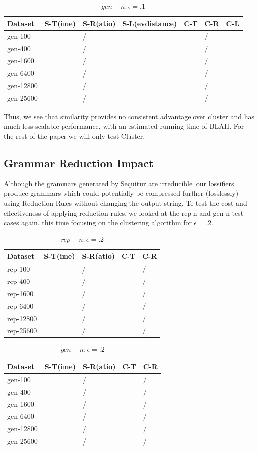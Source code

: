 \documentclass[11pt]{article}
\begin{document}
\begin{table}[t]
\begin{tabular}{l|l|l|l|l|l|l}
Dataset & S-T(ime) & S-R(atio) & S-L(evdistance) & C-T & C-R & C-L \\
\hline
gen-100   & & /& & & /& \\
gen-400   & & /& & & /& \\
gen-1600  & & /& & & /& \\
gen-6400  & & /& & & /& \\
gen-12800 & & /& & & /& \\
gen-25600 & & /& & & /& \\
\end{tabular}
\caption{$gen-n: \epsilon = .1$}
\end{table}

Thus, we see that similarity provides no consistent advantage over cluster
and has much less scalable performance, with an estimated running time of 
BLAH. For the rest of the paper we will only test Cluster.

\subsection{Grammar Reduction Impact}
Although the grammars generated by Sequitur are irreducible,
our lossifiers produce grammars which could potentially be
compressed further (losslessly) using Reduction Rules without
changing the output string. To test the cost and
effectiveness of applying reduction rules, we looked at the
rep-n and gen-n test cases again, this time focusing on the
clustering algorithm for $\epsilon = .2$.

\begin{table}[t]
\begin{tabular}{l|l|l|l|l}
Dataset & S-T(ime) & S-R(atio) & C-T & C-R \\
\hline
rep-100   & & /& & /\\
rep-400   & & /& & /\\
rep-1600  & & /& & /\\
rep-6400  & & /& & /\\
rep-12800 & & /& & /\\
rep-25600 & & /& & /\\
\end{tabular}
\caption{$rep-n: \epsilon = .2$}
\end{table}

\begin{table}[t]
\begin{tabular}{l|l|l|l|l}
Dataset & S-T(ime) & S-R(atio) & C-T & C-R \\
\hline
gen-100   & & /& & /\\
gen-400   & & /& & /\\
gen-1600  & & /& & /\\
gen-6400  & & /& & /\\
gen-12800 & & /& & /\\
gen-25600 & & /& & /\\
\end{tabular}
\caption{$gen-n: \epsilon = .2$}
\end{table}
\end{document}
